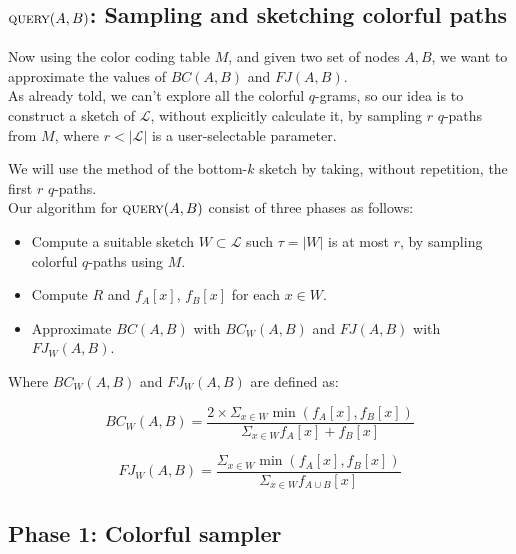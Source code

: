 \subsection*{$\textsc{query}(A,B)$: Sampling and sketching colorful paths}

Now using the color coding table $M$, and given two set of nodes $A, B$, 
we want to approximate the values of $BC(A,B)$ and $FJ(A,B)$.\\

As already told, we can't explore all the colorful $q$-grams, so our idea is to 
construct a sketch of $\mathcal{L}$, without explicitly calculate it, 
by sampling $r$ $q$-paths from $M$, where $r < |\mathcal{L}|$ is a user-selectable parameter.

We will use the method of the bottom-$k$ sketch by taking, without repetition, the first $r$ $q$-paths. \\

Our algorithm for $\textsc{query}(A,B)$ consist of three phases as follows:

\begin{itemize}
	\item Compute a suitable sketch $W \subset \mathcal{L}$ such $\tau = |W|$ is at most $r$, by sampling colorful $q$-paths using $M$.
	\item Compute $R$ and $f_{A}[x]$, $f_{B}[x]$ for each $x \in W$.
	\item Approximate $BC(A,B)$ with $BC_{W}(A,B)$ and $FJ(A,B)$ with $FJ_{W}(A,B)$.
\end{itemize}

Where $BC_{W}(A,B)$ and $FJ_{W}(A,B)$ are defined as:

\begin{equation}\label{bc-w}
	BC_{W}(A,B) = \frac{ 2 \times \Sigma_{x \in W} \min(f_{A}[x], f_{B}[x]) }{ \Sigma_{x \in W} f_{A}[x] + f_{B}[x] }
\end{equation}

\begin{equation}\label{fj-w}
	FJ_{W}(A,B) = \frac{ \Sigma_{x \in W} \min(f_{A}[x], f_{B}[x]) }{ \Sigma_{x \in W} f_{A \cup B}[x] }
\end{equation}

\subsection*{Phase 1: Colorful sampler}

